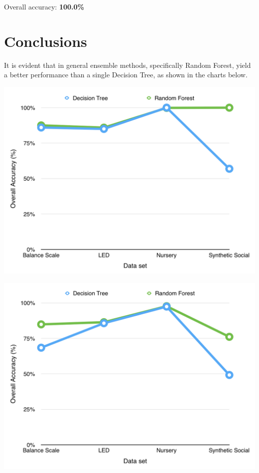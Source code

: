 \documentclass[11pt]{article}
\begin{document}
Overall accuracy: \textbf{100.0\%}\\

\section*{Conclusions}

It is evident that in general ensemble methods, specifically Random Forest, yield a better performance than a single Decision Tree, as shown in the charts below.\\

\begin{center}
\includegraphics[scale=0.7]{overall-train.png}
\end{center}

\begin{center}
\includegraphics[scale=0.7]{overall-test.png}
\end{center}
\end{document}
